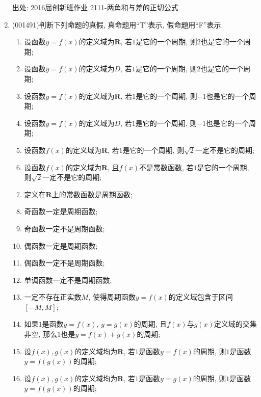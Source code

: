 \documentclass[10pt,a4paper]{article}
\newcommand{\blank}[1]{\underline{\hbox to #1pt{}}}
\begin{document}
\begin{enumerate}[1.]
出处: 2016届创新班作业	2111-两角和与差的正切公式
\item { (001491)}判断下列命题的真假, 真命题用``{\rm T}''表示, 假命题用``{\rm F}''表示.\\ 
\begin{enumerate}[\blank{30}(1)]
\item 设函数$y=f(x)$的定义域为$\mathbf{R}$, 若$1$是它的一个周期, 则$2$也是它的一个周期;\\ 
\item 设函数$y=f(x)$的定义域为$D$, 若$1$是它的一个周期, 则$2$也是它的一个周期;\\ 
\item 设函数$y=f(x)$的定义域为$\mathbf{R}$, 若$1$是它的一个周期, 则$-1$也是它的一个周期;\\ 
\item 设函数$y=f(x)$的定义域为$D$, 若$1$是它的一个周期, 则$-1$也是它的一个周期;\\ 
\item 设函数$f(x)$的定义域为$\mathbf{R}$, 若$1$是它的一个周期, 则$\sqrt{2}$一定不是它的周期;\\ 
\item 设函数$f(x)$的定义域为$\mathbf{R}$, 且$f(x)$不是常数函数, 若$1$是它的一个周期, 则$\sqrt{2}$一定不是它的周期;\\ 
\item 定义在$\mathbf{R}$上的常数函数是周期函数;\\ 
\item 奇函数一定是周期函数;\\ 
\item 奇函数一定不是周期函数;\\ 
\item 偶函数一定是周期函数;\\ 
\item 偶函数一定不是周期函数;\\ 
\item 单调函数一定不是周期函数;\\ 
\item 一定不存在正实数$M$, 使得周期函数$y=f(x)$的定义域包含于区间$[-M,M]$;\\ 
\item 如果$1$是函数$y=f(x)$, $y=g(x)$的周期, 且$f(x)$与$g(x)$定义域的交集非空, 那么$1$也是$y=f(x)+g(x)$的周期;\\ 
\item 设$f(x),g(x)$的定义域均为$\mathbf{R}$, 若$1$是函数$y=f(x)$的周期, 则$1$是函数$y=f(g(x))$的周期;\\ 
\item 设$f(x),g(x)$的定义域均为$\mathbf{R}$, 若$1$是函数$y=g(x)$的周期, 则$1$是函数$y=f(g(x))$的周期;\\ 

\end{enumerate}
\end{enumerate}
\end{document}
